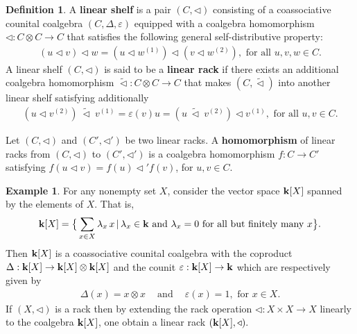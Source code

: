 \documentclass[a4paper,reqno,10pt]{amsart}
\theoremstyle{plain}
\theoremstyle{definition}
\newtheorem{defn}[thm]{Definition}
\newtheorem{exam}[thm]{Example}
\theoremstyle{remark}
\begin{document}
\begin{defn} \cite{carter,lebed,xu-sheng}
    A {\bf linear shelf} is a pair $(C, \triangleleft)$ consisting of a coassociative counital coalgebra $(C, \Delta, \varepsilon)$ equipped with a coalgebra homomorphism $\triangleleft : C \otimes C \rightarrow C$ that satisfies the following general self-distributive property:
    \begin{align*}
        (u \triangleleft v) \triangleleft w = (u \triangleleft w^{(1)}) \triangleleft (v \triangleleft w^{(2)}), \text{ for all } u, v, w \in C.
    \end{align*}
    A linear shelf $(C, \triangleleft)$ is said to be a {\bf linear rack} if there exists an additional coalgebra homomorphism $\widetilde{\triangleleft} : C \otimes C \rightarrow C$ that makes $(C, \widetilde{\triangleleft})$ into another linear shelf satisfying additionally
    \begin{align}\label{addition-lin}
        (u \triangleleft v^{(2)}) ~\widetilde{\triangleleft}  ~v^{(1)} = \varepsilon (v) u = (u ~\widetilde{\triangleleft} ~ v^{(2)}) \triangleleft v^{(1)}, \text{ for all } u , v \in C.
    \end{align}
\end{defn}

Let $(C, \triangleleft)$ and $(C', \triangleleft')$ be two linear racks. A {\bf homomorphism} of linear racks from $(C, \triangleleft)$ to $(C', \triangleleft')$ is a coalgebra homomorphism $f : C \rightarrow C'$ satisfying $f (u \triangleleft v) = f(u) \triangleleft' f(v)$, for $u, v \in C.$

\begin{exam}\label{exam-lrack}
    For any nonempty set $X$, consider the vector space ${\bf k}[X]$ spanned by the elements of $X$. That is, 
    \begin{align*}
        {\bf k} [X] = \big\{ \sum_{x \in X} \lambda_x ~ \!  x ~ \! | ~ \! \lambda_x \in {\bf k} \text{ and } \lambda_x = 0 \text{ for all but finitely many } x \big\}.
    \end{align*}
    Then ${\bf k} [X]$ is a coassociative counital coalgebra with the coproduct $\Delta : {\bf k} [X] \rightarrow {\bf k} [X] \otimes {\bf k} [X]$ and the counit $\varepsilon : {\bf k} [X] \rightarrow {\bf k}$ which are respectively given by
    \begin{align*}
        \Delta (x) = x \otimes x ~~~~ \text{ and } ~~~~ \varepsilon (x) = 1, \text{ for } x \in X.
    \end{align*}
    If $(X , \triangleleft )$ is a rack then by extending the rack operation $\triangleleft : X \times X \rightarrow X$ linearly to the coalgebra ${\bf k} [X]$, one obtain a linear rack $({\bf k} [X], \triangleleft).$
\end{exam}
\end{document}
